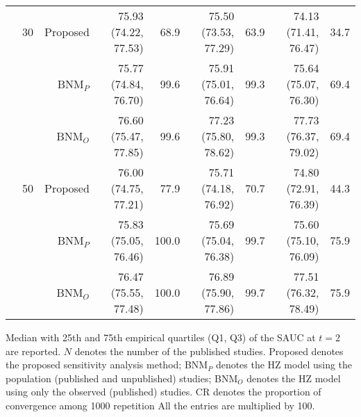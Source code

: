 \begin{table}[!htb]
\begin{threeparttable}
\begin{tabular}[t]{rrrrrrrrr}
\addlinespace
 & 30 & Proposed & 75.93 (74.22, 77.53) & 68.9 & 75.50 (73.53, 77.29) & 63.9 & 74.13 (71.41, 76.47) & 34.7\\
 &  & BNM$_P$ & 75.77 (74.84, 76.70) & 99.6 & 75.91 (75.01, 76.64) & 99.3 & 75.64 (75.07, 76.30) & 69.4\\
 &  & BNM$_O$ & 76.60 (75.47, 77.85) & 99.6 & 77.23 (75.80, 78.62) & 99.3 & 77.73 (76.37, 79.02) & 69.4\\
\addlinespace
 & 50 & Proposed & 76.00 (74.75, 77.21) & 77.9 & 75.71 (74.18, 76.92) & 70.7 & 74.80 (72.91, 76.39) & 44.3\\
 &  & BNM$_P$ & 75.83 (75.05, 76.46) & 100.0 & 75.69 (75.04, 76.38) & 99.7 & 75.60 (75.10, 76.09) & 75.9\\
 &  & BNM$_O$ & 76.47 (75.55, 77.48) & 100.0 & 76.89 (75.90, 77.86) & 99.7 & 77.51 (76.32, 78.49) & 75.9\\
\bottomrule
\end{tabular}
\begin{tablenotes}
\item 
			Median with 25th and 75th empirical quartiles (Q1, Q3) of the SAUC at $t=2$ are reported. 
			$N$ denotes the number of the published studies. 
			Proposed denotes the proposed sensitivity analysis method;
			BNM$_P$ denotes the HZ model using the population (published and unpublished) studies; 
			BNM$_O$ denotes the HZ model using only the observed (published) studies.
			CR denotes the proportion of convergence among 1000 repetition
			All the entries are multiplied by 100.
\end{tablenotes}
\end{threeparttable}
\end{table}
